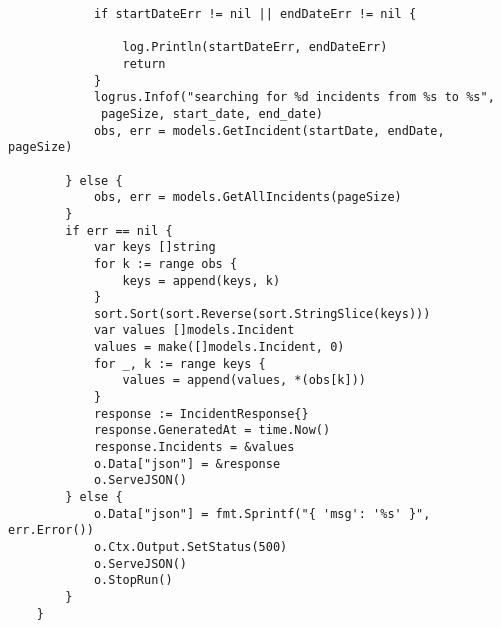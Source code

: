 \begin{verbatim}
            if startDateErr != nil || endDateErr != nil {

                log.Println(startDateErr, endDateErr)
                return
            }
            logrus.Infof("searching for %d incidents from %s to %s",
             pageSize, start_date, end_date)
            obs, err = models.GetIncident(startDate, endDate, pageSize)

        } else {
            obs, err = models.GetAllIncidents(pageSize)
        }
        if err == nil {
            var keys []string
            for k := range obs {
                keys = append(keys, k)
            }
            sort.Sort(sort.Reverse(sort.StringSlice(keys)))
            var values []models.Incident
            values = make([]models.Incident, 0)
            for _, k := range keys {
                values = append(values, *(obs[k]))
            }
            response := IncidentResponse{}
            response.GeneratedAt = time.Now()
            response.Incidents = &values
            o.Data["json"] = &response
            o.ServeJSON()
        } else {
            o.Data["json"] = fmt.Sprintf("{ 'msg': '%s' }", err.Error())
            o.Ctx.Output.SetStatus(500)
            o.ServeJSON()
            o.StopRun()
        }
    }


\end{verbatim}



